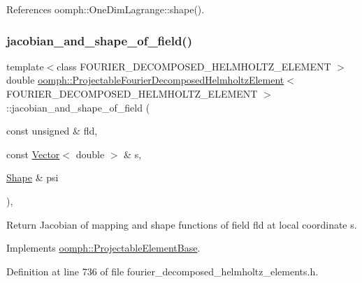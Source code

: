 References oomph\+::\+One\+Dim\+Lagrange\+::shape().

\mbox{\label{classoomph_1_1ProjectableFourierDecomposedHelmholtzElement_a7ba6062f40bc46b7c3e09fb77857aa19}} 
\subsubsection{\texorpdfstring{jacobian\+\_\+and\+\_\+shape\+\_\+of\+\_\+field()}{jacobian\_and\_shape\_of\_field()}}
{\footnotesize\ttfamily template$<$class F\+O\+U\+R\+I\+E\+R\+\_\+\+D\+E\+C\+O\+M\+P\+O\+S\+E\+D\+\_\+\+H\+E\+L\+M\+H\+O\+L\+T\+Z\+\_\+\+E\+L\+E\+M\+E\+NT $>$ \\
double \hyperlink{classoomph_1_1ProjectableFourierDecomposedHelmholtzElement}{oomph\+::\+Projectable\+Fourier\+Decomposed\+Helmholtz\+Element}$<$ F\+O\+U\+R\+I\+E\+R\+\_\+\+D\+E\+C\+O\+M\+P\+O\+S\+E\+D\+\_\+\+H\+E\+L\+M\+H\+O\+L\+T\+Z\+\_\+\+E\+L\+E\+M\+E\+NT $>$\+::jacobian\+\_\+and\+\_\+shape\+\_\+of\+\_\+field (\begin{DoxyParamCaption}\item[{const unsigned \&}]{fld,  }\item[{const \hyperlink{classoomph_1_1Vector}{Vector}$<$ double $>$ \&}]{s,  }\item[{\hyperlink{classoomph_1_1Shape}{Shape} \&}]{psi }\end{DoxyParamCaption})\hspace{0.3cm}{\ttfamily [inline]}, {\ttfamily [virtual]}}



Return Jacobian of mapping and shape functions of field fld at local coordinate s. 



Implements \hyperlink{classoomph_1_1ProjectableElementBase_ad45c21b58c0985d52f68ab2d79cbb488}{oomph\+::\+Projectable\+Element\+Base}.



Definition at line 736 of file fourier\+\_\+decomposed\+\_\+helmholtz\+\_\+elements.\+h.


